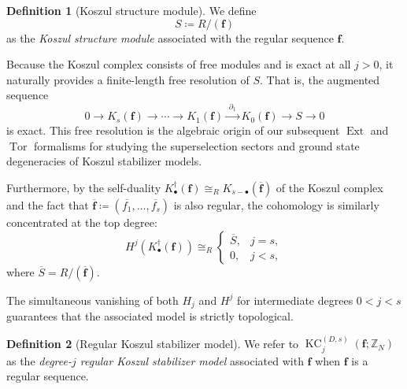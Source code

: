 \documentclass[aps,prx,english,superscriptaddress,twocolumn,tightenlines,showpacs,longbibliography,floatfix,amsfonts]{revtex4-2}
\theoremstyle{remark}
\theoremstyle{definition}
\newtheorem{definition}{Definition}
\begin{document}
\begin{definition}[Koszul structure module]
	\label{def:koszul-structure-module}
	We define
	\begin{equation}
		S \coloneqq R/(\mathbf{f}) \label{eq:structure}
	\end{equation}
	as the \emph{Koszul structure module} associated with the regular sequence $\mathbf{f}$.
\end{definition}

Because the Koszul complex consists of free modules and is exact at all $j > 0$, it naturally provides a finite-length free resolution of $S$. That is, the augmented sequence
\begin{equation}
	0 \longrightarrow K_s(\mathbf{f}) \longrightarrow \cdots \longrightarrow K_1(\mathbf{f}) \xrightarrow{\;\partial_1\;} K_0(\mathbf{f}) \longrightarrow S \longrightarrow 0
\end{equation}
is exact. This free resolution is the algebraic origin of our subsequent $\operatorname{Ext}$ and $\operatorname{Tor}$ formalisms for studying the superselection sectors and ground state degeneracies of Koszul stabilizer models.

Furthermore, by the self-duality $K_\bullet^\dagger(\mathbf{f}) \cong_R K_{s-\bullet}(\overline{\mathbf{f}})$ of the Koszul complex and the fact that $\overline{\mathbf{f}} \coloneqq (\overline{f_1}, \dots, \overline{f_s})$ is also regular, the cohomology is similarly concentrated at the top degree:
\begin{equation}
	H^j(K_\bullet^\dagger(\mathbf{f})) \cong_R
	\begin{cases}
		\overline{S}, & j = s, \\
		0, & j < s,
	\end{cases} \label{eq:koszul-cohomology}
\end{equation}
where $\overline{S} = R/(\overline{\mathbf{f}})$.

The simultaneous vanishing of both $H_j$ and $H^j$ for intermediate degrees $0 < j < s$ guarantees that the associated model is strictly topological.

\begin{definition}[Regular Koszul stabilizer model]
	\label{def:regular_KC}
	We refer to $\operatorname{KC}_j^{(D,s)}(\mathbf{f};\mathbb{Z}_N)$ as the \emph{degree-$j$ regular Koszul stabilizer model} associated with $\mathbf{f}$ when $\mathbf{f}$ is a regular sequence.
\end{definition}
\end{document}
